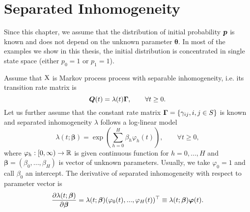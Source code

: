 {%
\section{Separated Inhomogeneity}
	\label{chap:statSeparInhom}
	
	Since this chapter, we assume that the distribution of initial probability $\bm{p}$ is known and does not depend on the unknown parameter $\bm{\theta}$. In most of the examples we show in this thesis, the initial distribution is concentrated in single state space (either $p_0 = 1$ or $p_1 = 1$).

Assume that $\operatorname{\bm{X}}$ is Markov process process with separable inhomogeneity, i.e. its transition rate matrix is
\[
	\bm{Q}(t) = \lambda(t) \bm{\Gamma}, \qquad \forall t \geq 0.
\]
Let us further assume that the constant rate matrix $\bm{\Gamma} = \{\gamma_{ij}, i,j \in S \}$ is known and separated inhomogeneity $\lambda$ follows a log-linear model
\begin{equation}
	\label{eq:logLinearIntensity}
	\lambda (t; \bm{\beta}) = \exp \left( \sum_{h=0}^{H} \beta_h \varphi_h (t) \right), \qquad \forall t \geq 0,
\end{equation}
where $\varphi_h: [0, \infty) \to \mathbb{R}$ is given continuous function for $h = 0, ..., H$ and $\bm{\beta} = (\beta_0, ..., \beta_H)$ is vector of unknown parameters. Usually, we take $\varphi_0 = 1$ and call $\beta_0$ an intercept. The derivative of separated inhomogeneity with respect to parameter vector is
\[
	\frac{\partial \lambda (t; \bm{\beta})}{\partial \bm{\beta}} = \lambda (t; \bm{\beta}) (\varphi_0 (t), ..., \varphi_H (t))^\top \equiv \lambda (t; \bm{\beta}) \bm{\varphi} (t).
\]

}

